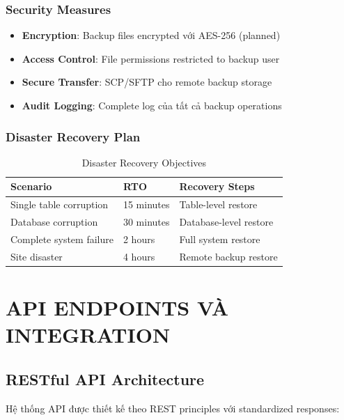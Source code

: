 \documentclass[12pt,a4paper]{article}
\begin{document}
\subsubsection{Security Measures}
\begin{itemize}
    \item \textbf{Encryption}: Backup files encrypted với AES-256 (planned)
    \item \textbf{Access Control}: File permissions restricted to backup user
    \item \textbf{Secure Transfer}: SCP/SFTP cho remote backup storage
    \item \textbf{Audit Logging}: Complete log của tất cả backup operations
\end{itemize}

\subsubsection{Disaster Recovery Plan}
\begin{table}[H]
\centering
\begin{tabular}{@{}lll@{}}
\toprule
\textbf{Scenario} & \textbf{RTO} & \textbf{Recovery Steps} \\
\midrule
Single table corruption & 15 minutes & Table-level restore \\
Database corruption & 30 minutes & Database-level restore \\
Complete system failure & 2 hours & Full system restore \\
Site disaster & 4 hours & Remote backup restore \\
\bottomrule
\end{tabular}
\caption{Disaster Recovery Objectives}
\end{table}

\section{API ENDPOINTS VÀ INTEGRATION}

\subsection{RESTful API Architecture}
Hệ thống API được thiết kế theo REST principles với standardized responses:
\end{document}
